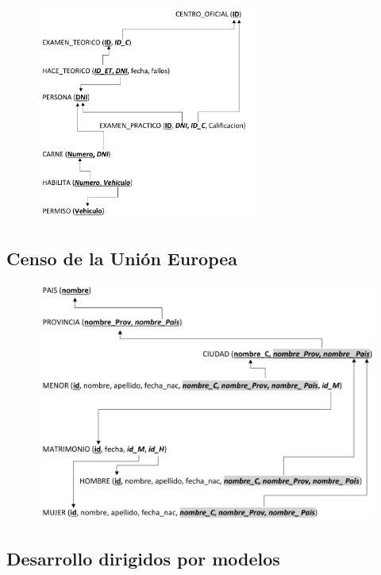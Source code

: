 \documentclass{db-practice}
\begin{document}
\begin{figure}[H]
    \includegraphics[width=0.65\textwidth]{figs/paso-a-tablas/permiso-de-circulacion-sol}
\end{figure}

\subsection{Censo de la Unión Europea}

\begin{figure}[H]
    \includegraphics[width=\textwidth]{figs/paso-a-tablas/censo-union-europea-sol}
\end{figure}

\subsection{Desarrollo dirigidos por modelos}
\end{document}
